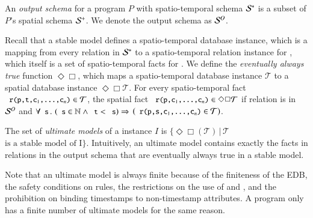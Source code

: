 

An {\em output schema} for a \lang program $P$ with spatio-temporal schema
$\stschema$ is a subset of $P$'s spatial schema $\sschema$.  We denote the output schema as
$\oschema$.

Recall that a stable model defines a spatio-temporal database instance, which is a mapping from every relation  in $\stschema$ to a spatio-temporal relation instance for , which itself is a set of spatio-temporal facts for .  We define the {\em eventually always true} function $\Diamond\Box$, which maps a spatio-temporal database instance $\mathcal{T}$ to a spatial database instance $\Diamond\Box\mathcal{T}$.  For every spatio-temporal fact $\dedalus{r(p,t,c\sub{1},\ldots,c\sub{n})} \in \mathcal{T}$, the spatial fact $\dedalus{r(p,c\sub{1},\ldots,c\sub{n})} \in \Diamond\Box\mathcal{T}$ if relation  is in $\oschema$ and $\forall \dedalus{s}\, . \, \left(\dedalus{s} \in \mathbb{N} \land \dedalus{t} < \dedalus{s}\right) \Rightarrow$ \linebreak $\left(\dedalus{r(p,s,c\sub{1},\ldots,c\sub{n})} \in \mathcal{T}\right)$.

The set of {\em ultimate models} of a \lang instance $I$ is
$\{\Diamond\Box(\mathcal{T}) \, | \, \mathcal{T}$ $\text{is a stable model of
  I}\}$.  Intuitively, an ultimate model contains exactly the facts in relations
in the output schema that are eventually always true in a stable model.

Note that an ultimate model is always finite because of the finiteness of the EDB, the safety conditions on rules, the restrictions on the use of  and , and the prohibition on binding timestamps to non-timestamp attributes.  A \lang program only has a finite number of ultimate models for the same reason.


